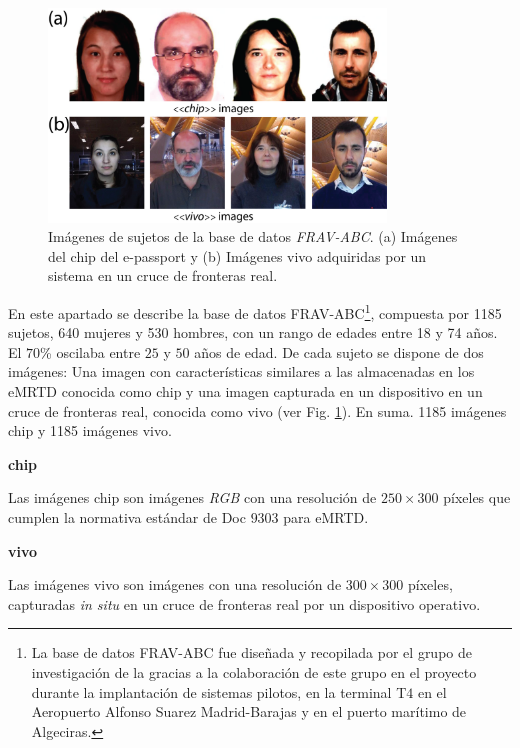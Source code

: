 \begin{figure}[ht]
     \centering
     \includegraphics[width=0.8\textwidth]{ch-sistemasABC/images/ch-BBDDs/CHIP_VIVO_IMAGENES.png}
     \caption{Imágenes de sujetos de la base de datos \textit{\Gls{FRAV-ABC}}. (a) Imágenes del \gls{chip} del \gls{e-passport} y (b) Imágenes \gls{vivo} adquiridas por un sistema  en un cruce de fronteras real.}
     \label{fig:SAMPLES-FRAV-ABC1}
\end{figure}

En este apartado se describe la base de datos \Gls{FRAV-ABC}\footnote{La base de datos \Gls{FRAV-ABC} fue diseñada y recopilada por el grupo de investigación  de la \cite{urjcOnline} gracias a la colaboración de este grupo en el proyecto \cite{ABC4EUOnline} durante la implantación de sistemas  pilotos, en la terminal T$4$ en el Aeropuerto Alfonso Suarez Madrid-Barajas y en el puerto marítimo de Algeciras.}, compuesta por 1185 sujetos, 640 mujeres y 530 hombres, con un rango de edades entre 18 y 74 años. El $70$\% oscilaba entre $25$ y $50$ años de edad. De cada sujeto se dispone de dos imágenes: Una imagen con características similares a las almacenadas en los \gls{eMRTD} conocida como \gls{chip} y una imagen capturada en un dispositivo  en un cruce de fronteras real, conocida como \gls{vivo} (ver Fig. \ref{fig:SAMPLES-FRAV-ABC1}). En suma. 1185 imágenes \gls{chip} y 1185 imágenes \gls{vivo}.

\medskip
\textbf{\gls{chip}}

Las imágenes \gls{chip} son imágenes \textit{RGB} con una resolución de $250\times300$ píxeles que cumplen la normativa estándar de  Doc $9303$ \cite{doc20069303} para \gls{eMRTD}.

\medskip
\textbf{\gls{vivo}}

Las imágenes \gls{vivo} son imágenes  con una resolución de $300\times300$ píxeles, capturadas \textit{in situ} en un cruce de fronteras real por un dispositivo  operativo.
\medskip
   
